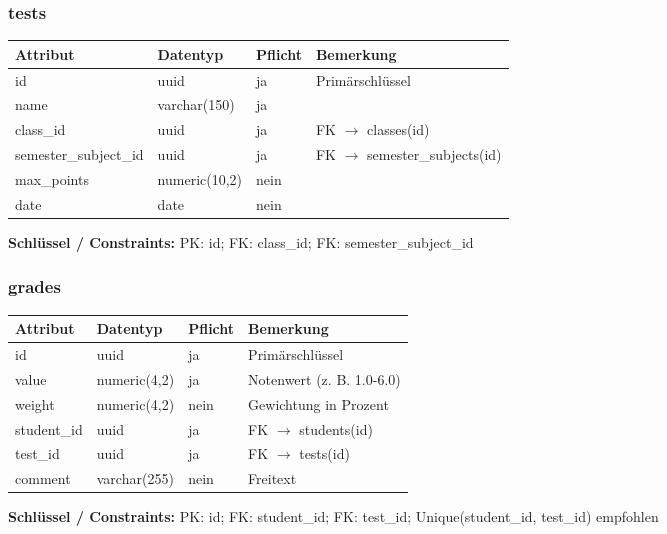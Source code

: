 \documentclass[12pt,a4paper]{article}
\begin{document}
    \subsubsection{tests}
    \begin{longtable}{|p{4cm}|p{3cm}|p{3cm}|p{4cm}|}
        \hline
        \textbf{Attribut} & \textbf{Datentyp} & \textbf{Pflicht} & \textbf{Bemerkung} \\ \hline
        id & uuid & ja & Primärschlüssel \\ \hline
        name & varchar(150) & ja &  \\ \hline
        class\_id & uuid & ja & FK $\rightarrow$ classes(id) \\ \hline
        semester\_subject\_id & uuid & ja & FK $\rightarrow$ semester\_subjects(id) \\ \hline
        max\_points & numeric(10,2) & nein &  \\ \hline
        date & date & nein &  \\ \hline
    \end{longtable}
    \textbf{Schlüssel / Constraints:} PK: id; FK: class\_id; FK: semester\_subject\_id

    \subsubsection{grades}
    \begin{longtable}{|p{4cm}|p{3cm}|p{3cm}|p{4cm}|}
        \hline
        \textbf{Attribut} & \textbf{Datentyp} & \textbf{Pflicht} & \textbf{Bemerkung} \\ \hline
        id & uuid & ja & Primärschlüssel \\ \hline
        value & numeric(4,2) & ja & Notenwert (z. B. 1.0-6.0) \\ \hline
        weight & numeric(4,2) & nein & Gewichtung in Prozent \\ \hline
        student\_id & uuid & ja & FK $\rightarrow$ students(id) \\ \hline
        test\_id & uuid & ja & FK $\rightarrow$ tests(id) \\ \hline
        comment & varchar(255) & nein & Freitext \\ \hline
    \end{longtable}
    \textbf{Schlüssel / Constraints:} PK: id; FK: student\_id; FK: test\_id; Unique(student\_id, test\_id) empfohlen
\end{document}
